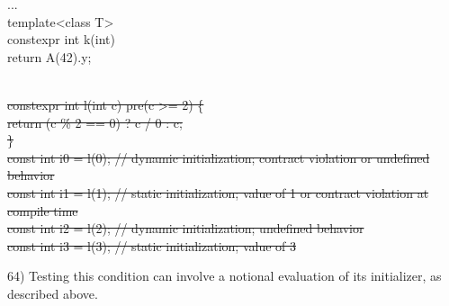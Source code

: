 \begin{modification}
\noindent
{\ttfamily\footnotesize
...\\
template<class T>\\
constexpr int k(int) \\
\hspace*{2\fontdimen2\font}return A(42).y;\\
\\
}\par
\noindent
\colorbox{red!60}{%
  \parbox{\dimexpr\linewidth-2\fboxsep\relax}{%
    \ttfamily\footnotesize
    \sout{constexpr int l(int c) pre(c >= 2) \{}\\%
    \hspace*{2\fontdimen2\font}\sout{return (c \% 2 == 0) ? c / 0 : c;}\\%
    \sout{\}}\\%
    \sout{const int i0 = l(0); // dynamic initialization; contract violation or undefined behavior}\\%
    \sout{const int i1 = l(1); // static initialization; value of 1 or contract violation at compile time}\\%
    \sout{const int i2 = l(2); // dynamic initialization; undefined behavior}\\%
    \sout{const int i3 = l(3); // static initialization; value of 3}%
  }%
}

\end{modification}


\begin{modification}
64) Testing this condition can involve a notional evaluation of its
initializer, as described above.
\end{modification}
